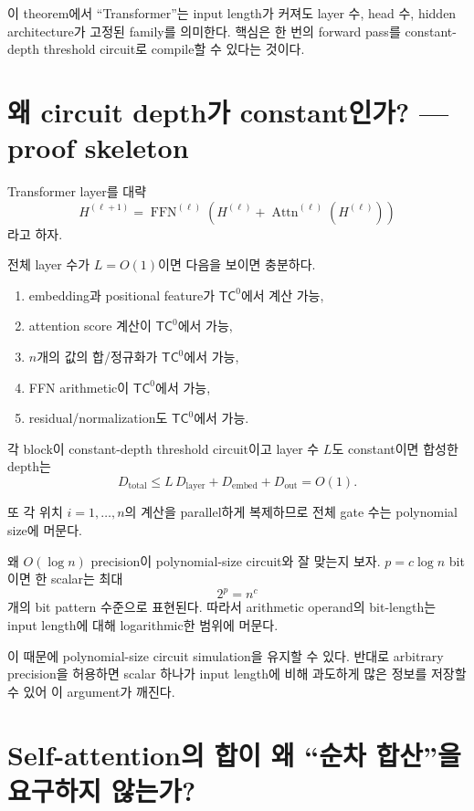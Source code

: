 \documentclass[11pt,a4paper,oneside,openany]{memoir}
\theoremstyle{definition}
\newcommand{\TC}{\mathsf{TC}}
\begin{document}
\begin{paperbox}
이 theorem에서 ``Transformer''는 input length가 커져도 layer 수, head 수, hidden architecture가 고정된 family를 의미한다. 핵심은 한 번의 forward pass를 constant-depth threshold circuit로 compile할 수 있다는 것이다.
\end{paperbox}

\section{왜 circuit depth가 constant인가? --- proof skeleton}

Transformer layer를 대략
\[
H^{(\ell+1)}
=
\operatorname{FFN}^{(\ell)}
\left(
H^{(\ell)}+
\operatorname{Attn}^{(\ell)}(H^{(\ell)})
\right)
\]
라고 하자.

전체 layer 수가 $L=O(1)$이면 다음을 보이면 충분하다.

\begin{enumerate}
  \item embedding과 positional feature가 $\TC^0$에서 계산 가능,
  \item attention score 계산이 $\TC^0$에서 가능,
  \item $n$개의 값의 합/정규화가 $\TC^0$에서 가능,
  \item FFN arithmetic이 $\TC^0$에서 가능,
  \item residual/normalization도 $\TC^0$에서 가능.
\end{enumerate}

각 block이 constant-depth threshold circuit이고 layer 수 $L$도 constant이면 합성한 depth는
\[
D_{\mathrm{total}}
\le
L\,D_{\mathrm{layer}}+D_{\mathrm{embed}}+D_{\mathrm{out}}
=O(1).
\]

또 각 위치 $i=1,\dots,n$의 계산을 parallel하게 복제하므로 전체 gate 수는 polynomial size에 머문다.

\begin{suppbox}
왜 $O(\log n)$ precision이 polynomial-size circuit와 잘 맞는지 보자. $p=c\log n$ bit이면 한 scalar는 최대
\[
2^p=n^c
\]
개의 bit pattern 수준으로 표현된다. 따라서 arithmetic operand의 bit-length는 input length에 대해 logarithmic한 범위에 머문다.

이 때문에 polynomial-size circuit simulation을 유지할 수 있다. 반대로 arbitrary precision을 허용하면 scalar 하나가 input length에 비해 과도하게 많은 정보를 저장할 수 있어 이 argument가 깨진다.
\end{suppbox}

\section{Self-attention의 합이 왜 ``순차 합산''을 요구하지 않는가?}
\end{document}
